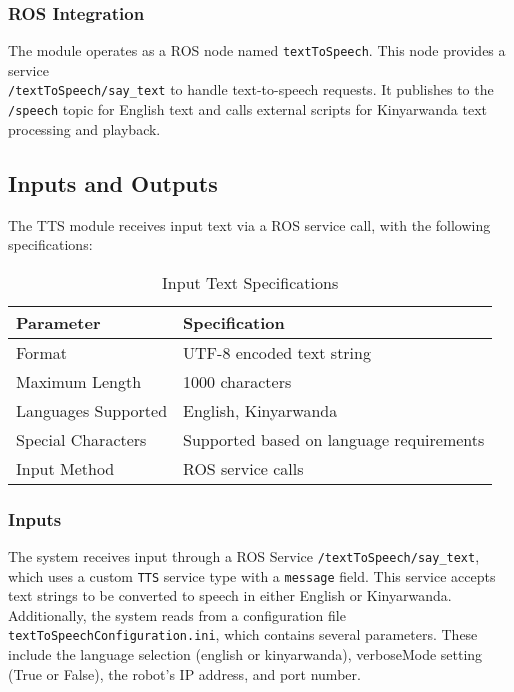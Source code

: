 \documentclass{CSSRforAfrica}
\begin{document}
\subsubsection{ROS Integration}

The module operates as a ROS node named \texttt{textToSpeech}. This node provides a service \\ \texttt{/textToSpeech/say\_text} to handle text-to-speech requests. It publishes to the \texttt{/speech} topic for English text and calls external scripts for Kinyarwanda text processing and playback.

\subsection{Inputs and Outputs}
The TTS module receives input text via a ROS service call, with the following specifications:

\begin{table}[h]
\centering
\begin{tabular}{|l|l|}
\hline
\rowcolor{lightgray} \textbf{Parameter} & \textbf{Specification} \\ \hline
Format & UTF-8 encoded text string \\
\hline
Maximum Length & 1000 characters \\
\hline
Languages Supported & English, Kinyarwanda \\
\hline
Special Characters & Supported based on language requirements \\
\hline
Input Method & ROS service calls \\
\hline
\end{tabular}
\caption{Input Text Specifications}
\label{tab:input-specs}
\end{table}

\subsubsection{Inputs}

The system receives input through a ROS Service \texttt{/textToSpeech/say\_text}, which uses a custom \texttt{TTS} service type with a \texttt{message} field. This service accepts text strings to be converted to speech in either English or Kinyarwanda. Additionally, the system reads from a configuration file \texttt{textToSpeechConfiguration.ini}, which contains several parameters. These include the language selection (english or kinyarwanda), verboseMode setting (True or False), the robot's IP address, and port number.
\end{document}
